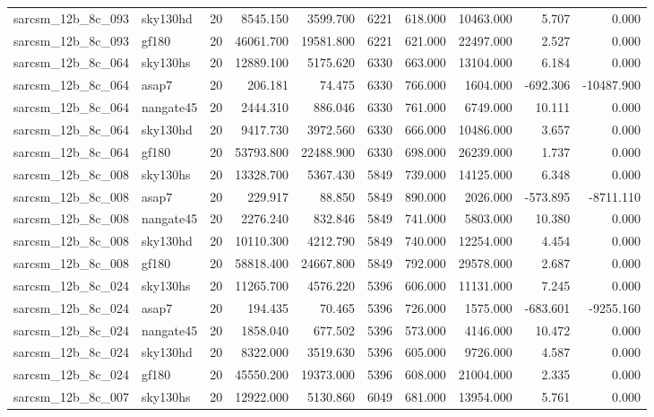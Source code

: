 \documentclass{article}
\begin{document}
\begin{longtable}{llrrrrrrrr}
sarcsm\_12b\_8c\_093 & sky130hd & 20 & 8545.150 & 3599.700 & 6221 & 618.000 & 10463.000 & 5.707 & 0.000 \\
sarcsm\_12b\_8c\_093 & gf180 & 20 & 46061.700 & 19581.800 & 6221 & 621.000 & 22497.000 & 2.527 & 0.000 \\
sarcsm\_12b\_8c\_064 & sky130hs & 20 & 12889.100 & 5175.620 & 6330 & 663.000 & 13104.000 & 6.184 & 0.000 \\
sarcsm\_12b\_8c\_064 & asap7 & 20 & 206.181 & 74.475 & 6330 & 766.000 & 1604.000 & -692.306 & -10487.900 \\
sarcsm\_12b\_8c\_064 & nangate45 & 20 & 2444.310 & 886.046 & 6330 & 761.000 & 6749.000 & 10.111 & 0.000 \\
sarcsm\_12b\_8c\_064 & sky130hd & 20 & 9417.730 & 3972.560 & 6330 & 666.000 & 10486.000 & 3.657 & 0.000 \\
sarcsm\_12b\_8c\_064 & gf180 & 20 & 53793.800 & 22488.900 & 6330 & 698.000 & 26239.000 & 1.737 & 0.000 \\
sarcsm\_12b\_8c\_008 & sky130hs & 20 & 13328.700 & 5367.430 & 5849 & 739.000 & 14125.000 & 6.348 & 0.000 \\
sarcsm\_12b\_8c\_008 & asap7 & 20 & 229.917 & 88.850 & 5849 & 890.000 & 2026.000 & -573.895 & -8711.110 \\
sarcsm\_12b\_8c\_008 & nangate45 & 20 & 2276.240 & 832.846 & 5849 & 741.000 & 5803.000 & 10.380 & 0.000 \\
sarcsm\_12b\_8c\_008 & sky130hd & 20 & 10110.300 & 4212.790 & 5849 & 740.000 & 12254.000 & 4.454 & 0.000 \\
sarcsm\_12b\_8c\_008 & gf180 & 20 & 58818.400 & 24667.800 & 5849 & 792.000 & 29578.000 & 2.687 & 0.000 \\
sarcsm\_12b\_8c\_024 & sky130hs & 20 & 11265.700 & 4576.220 & 5396 & 606.000 & 11131.000 & 7.245 & 0.000 \\
sarcsm\_12b\_8c\_024 & asap7 & 20 & 194.435 & 70.465 & 5396 & 726.000 & 1575.000 & -683.601 & -9255.160 \\
sarcsm\_12b\_8c\_024 & nangate45 & 20 & 1858.040 & 677.502 & 5396 & 573.000 & 4146.000 & 10.472 & 0.000 \\
sarcsm\_12b\_8c\_024 & sky130hd & 20 & 8322.000 & 3519.630 & 5396 & 605.000 & 9726.000 & 4.587 & 0.000 \\
sarcsm\_12b\_8c\_024 & gf180 & 20 & 45550.200 & 19373.000 & 5396 & 608.000 & 21004.000 & 2.335 & 0.000 \\
sarcsm\_12b\_8c\_007 & sky130hs & 20 & 12922.000 & 5130.860 & 6049 & 681.000 & 13954.000 & 5.761 & 0.000 \\

\end{longtable}
\end{document}
